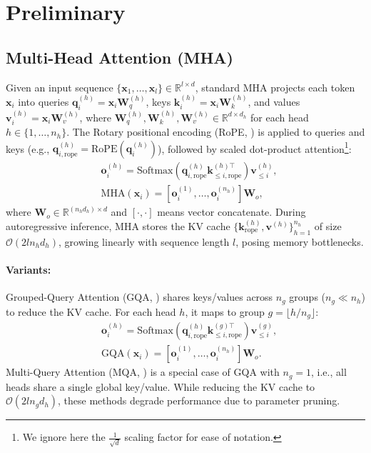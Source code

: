 \section{Preliminary}
\label{sec:preliminary}

\subsection{Multi-Head Attention (MHA)}  
Given an input sequence \(\{\bm{x}_1,\dots, \bm{x}_l\} \in \mathbb{R}^{l \times d}\), standard MHA \cite{nips/VaswaniSPUJGKP17} projects each token \(\bm{x}_i\) into queries \(\bm{q}_i^{(h)} = \bm{x}_i \bm{W}_q^{(h)}\), keys \(\bm{k}_i^{(h)} = \bm{x}_i \bm{W}_k^{(h)}\), and values \(\bm{v}_i^{(h)} = \bm{x}_i \bm{W}_v^{(h)}\), where \( \bm{W}_q^{(h)}, \bm{W}_k^{(h)}, \bm{W}_v^{(h)} \in \mathbb{R}^{d \times d_h} \) for each head \( h \in \{1, \dots, n_h\} \). The Rotary positional encoding (RoPE, \citeyear{journals/ijon/SuALPBL24}) is applied to queries and keys (e.g., $\bm{q}_{i,\text{rope}}^{(h)}=\text{RoPE}(\bm{q}_{i}^{(h)})$), followed by scaled dot-product attention\footnote{
We ignore here the $\frac{1}{\sqrt{d}}$ scaling factor for ease of notation.
}:  
\begin{align}    
    &\bm{o}_i^{(h)} = \text{Softmax}\left(\bm{q}_{i,\text{rope}}^{(h)} \bm{k}_{\le i,\text{rope}}^{(h)\top}\right) \bm{v}_{\le i}^{(h)}, \nonumber \\
    &\text{MHA}(\bm{x}_i) = \left[\bm{o}_i^{(1)}, \dots, \bm{o}_i^{(n_h)}\right] \bm{W}_o, 
\end{align}
where $\bm{W}_o \in \mathbb{R}^{(n_h d_h) \times d}$ and $[\cdot,\cdot]$ means vector concatenate.
During autoregressive inference, MHA stores the KV cache \(\{\bm{k}_{\text{rope}}^{(h)}, \bm{v}^{(h)}\}_{h=1}^{n_h}\) of size \( \mathcal{O}(2 l n_h d_h) \), growing linearly with sequence length \( l \), posing memory bottlenecks.  

\paragraph{Variants:}  
Grouped-Query Attention (GQA, \citeyear{emnlp/AinslieLJZLS23}) shares keys/values across \( n_g \) groups (\( n_g \ll n_h \)) to reduce the KV cache. For each head \( h \), it maps to group \( g=\lfloor h/n_g \rfloor \):  
\begin{align}
    &\bm{o}_i^{(h)} = \text{Softmax}\left(\bm{q}_{i,\text{rope}}^{(h)} \bm{k}_{\le i,\text{rope}}^{(g)\top}\right) \bm{v}_{\le i}^{(g)}, \nonumber \\
    &\text{GQA}(\bm{x}_i) = \left[\bm{o}_i^{(1)}, \dots, \bm{o}_i^{(n_h)}\right] \bm{W}_o.
\end{align}
Multi-Query Attention (MQA, \citeyear{strubell-etal-2019-energy}) is a special case of GQA with \( n_g = 1 \), i.e., all heads share a single global key/value. 
While reducing the KV cache to \( \mathcal{O}(2 l n_g d_h) \), these methods degrade performance due to parameter pruning.


